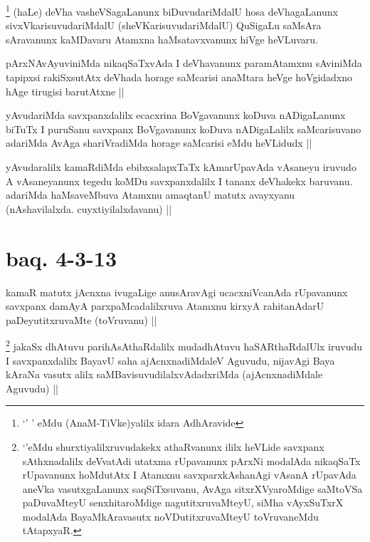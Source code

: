 \begin{artha}
\footnote{`\stext' \stext' eMdu (AnaM-TiVke)yalilx idara AdhAravide}
(haLe) deVha vasheVSagaLanunx biDuvudariMdalU hosa deVhagaLanunx sivxVkarisuvudariMdalU (sheVKarisuvudariMdalU) QuSigaLu saMsAra sAravanunx kaMDavaru Atamxna haMsatavxvanunx hiVge heVLuvaru.
\end{artha}


\begin{artha}
pArxNAvAyuviniMda nikaqSaTxvAda I deVhavanunx paramAtamxnu sAviniMda tapipxsi rakiSxsutAtx deVhada horage saMcarisi anaMtara heVge hoVgidadxno hAge tirugisi barutAtxne ||
\end{artha}


\begin{artha}
yAvudariMda savxpanxdalilx ecacxrina BoVgavanunx koDuva nADigaLanunx biTuTx I puruSanu savxpanx BoVgavanunx koDuva nADigaLalilx saMcarisuvano adariMda AvAga shariVradiMda horage saMcarisi eMdu heVLidudx ||
\end{artha}

\begin{artha}
yAvudaralilx kamaRdiMda ebibxsalapxTaTx kAmarUpavAda vAsaneyu iruvudo A vAsaneyanunx tegedu koMDu savxpanxdalilx I tananx deVhakekx baruvanu. adariMda haMsaveMbuva Atamxnu amaqtanU matutx avayxyanu (nAshavilalxda. cuyxtiyilalxdavanu) ||
\end{artha}

\section*{baq. 4-3-13}


\begin{artha}
kamaR matutx jAcnxna ivugaLige anusAravAgi ucacxniVcanAda rUpavanunx savxpanx damAyA parxpaMcadalilxruva Atamxnu kirxyA rahitanAdarU paDeyutitxruvaMte (toVruvanu) ||
\end{artha}


\begin{artha}
\footnote{`\stext'eMdu shurxtiyalilxruvudakekx athaRvanunx ililx heVLide savxpanx sAthxnadalilx deVvatAdi utatxma rUpavanunx pArxNi modalAda nikaqSaTx rUpavanunx hoMdutAtx I Atamxnu savxparxkAshanAgi vAsanA rUpavAda aneVka vasutxgaLanunx saqSiTxsuvanu, AvAga sitxrXVyaroMdige saMtoVSa paDuvaMteyU senxhitaroMdige nagutitxruvaMteyU, siMha vAyxSuTxrX modalAda BayaMkAravasutx noVDutitxruvaMteyU toVruvaneMdu tAtapxyaR.}
jakaSx dhAtuvu parihAsAthaRdalilx mudadhAtuvu haSARthaRdalUlx iruvudu I savxpanxdalilx BayavU saha ajAcnxnadiMdaleV Aguvudu, nijavAgi Baya kAraNa vasutx alilx saMBavisuvudilalxvAdadxriMda (ajAcnxnadiMdale Aguvudu) ||
\end{artha}

